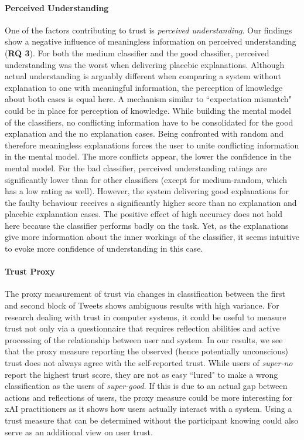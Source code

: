 \paragraph{Perceived Understanding} 
One of the factors contributing to trust is \textit{perceived understanding}. Our findings show a negative influence of meaningless information on perceived understanding (\textbf{RQ 3}). For both the medium classifier and the good classifier, perceived understanding was the worst when delivering placebic explanations. Although actual understanding is arguably different when comparing a system without explanation to one with meaningful information, the perception of knowledge about both cases is equal here. A mechanism similar to ``expectation mismatch" could be in place for perception of knowledge. While building the mental model of the classifiers, no conflicting information have to be consolidated for the good explanation and the no explanation cases. Being confronted with random and therefore meaningless explanations forces the user to unite conflicting information in the mental model. The more conflicts appear, the lower the confidence in the mental model.\newline
For the bad classifier, perceived understanding ratings are significantly lower than for other classifiers (except for medium-random, which has a low rating as well). However, the system delivering good explanations for the faulty behaviour receives a significantly higher score than no explanation and placebic explanation cases. The positive effect of high accuracy does not hold here because the classifier performs badly on the task. Yet, as the explanations give more information about the inner workings of the classifier, it seems intuitive to evoke more confidence of understanding in this case.\newline
\paragraph{Trust Proxy}
The proxy measurement of trust via changes in classification between the first and second block of Tweets shows ambiguous results with high variance. For research dealing with trust in computer systems, it could be useful to measure trust not only via a questionnaire that requires reflection abilities and active processing of the relationship between user and system. In our results, we see that the proxy measure reporting the observed (hence potentially unconscious) trust does not always agree with the self-reported trust. While users of \textit{super-no} report the highest trust score, they are not as easy ``lured" to make a wrong classification as the users of \textit{super-good}. If this is due to an actual gap between actions and reflections of users, the proxy measure could be more interesting for xAI practitioners as it shows how users actually interact with a system. Using a trust measure that can be determined without the participant knowing could also serve as an additional view on user trust.\medskip \newline
